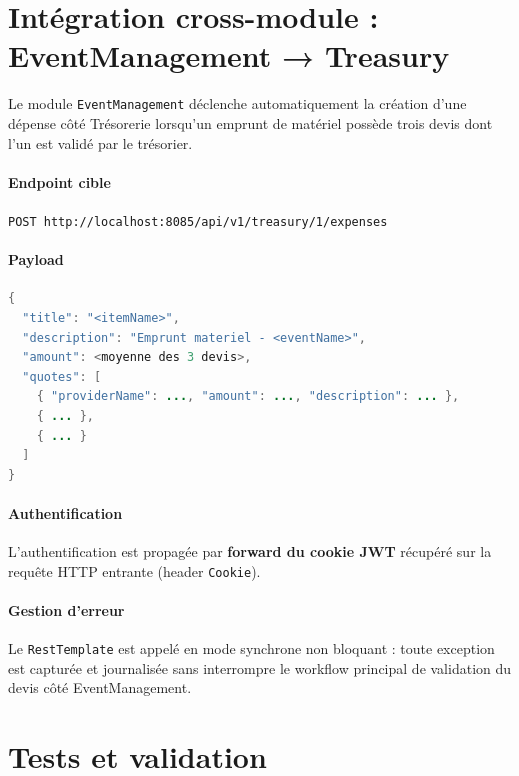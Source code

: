\documentclass[11pt,a4paper]{article}
\begin{document}
\section{Intégration cross-module : EventManagement → Treasury}

Le module \texttt{EventManagement} déclenche automatiquement la création d'une dépense côté Trésorerie lorsqu'un emprunt de matériel possède trois devis dont l'un est validé par le trésorier.

\paragraph{Endpoint cible} \texttt{POST http://localhost:8085/api/v1/treasury/1/expenses}

\paragraph{Payload}
\begin{lstlisting}[language=Java, caption={Construction du payload dans \texttt{TreasuryIntegrationService.java}}]
{
  "title": "<itemName>",
  "description": "Emprunt materiel - <eventName>",
  "amount": <moyenne des 3 devis>,
  "quotes": [
    { "providerName": ..., "amount": ..., "description": ... },
    { ... },
    { ... }
  ]
}
\end{lstlisting}

\paragraph{Authentification} L'authentification est propagée par \textbf{forward du cookie JWT} récupéré sur la requête HTTP entrante (header \texttt{Cookie}).

\paragraph{Gestion d'erreur} Le \texttt{RestTemplate} est appelé en mode synchrone non bloquant : toute exception est capturée et journalisée sans interrompre le workflow principal de validation du devis côté EventManagement.

\section{Tests et validation}
\end{document}
